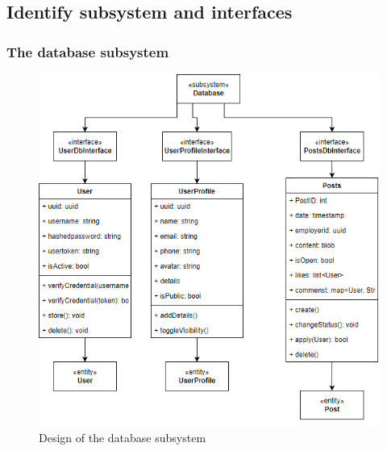 \documentclass[a4paper]{article}
\begin{document}
\subsection{Identify subsystem and interfaces}
\subsubsection{The database subsystem}
\begin{figure}[H]
    \centering
    \includegraphics[width=1.0\textwidth]{database_subsystem.png}
    \caption{Design of the database subsystem}
    \label{fig:fig32}
\end{figure}
\end{document}
